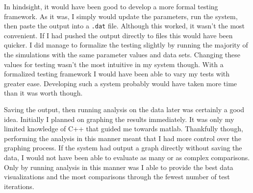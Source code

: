 \documentclass[10pt,letterpaper]{article}
\begin{document}
In hindsight, it would have been good to develop a more formal testing framework. As it was, I simply would update the parameters, run the system, then paste the output into a \texttt{.dat} file. Although this worked, it wasn't the most convenient. If I had pushed the output directly to files this would have been quicker. I did manage to formalize the testing slightly by running the majority of the simulations with the same parameter values and data sets. Changing these values for testing wasn't the most intuitive in my system though. With a formalized testing framework I would have been able to vary my tests with greater ease. Developing such a system probably would have taken more time than it was worth though.

Saving the output, then running analysis on the data later was certainly a good idea. Initially I planned on graphing the results immediately. It was only my limited knowledge of C++ that guided me towards matlab. Thankfully though, performing the analysis in this manner meant that I had more control over the graphing process. If the system had output a graph directly without saving the data, I would not have been able to evaluate as many or as complex comparisons. Only by running analysis in this manner was I able to provide the best data visualizations and the most comparisons through the fewest number of test iterations.
\end{document}
